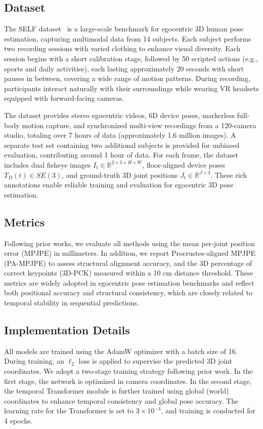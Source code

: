 \documentclass[conference]{IEEEtran}
\begin{document}
\subsection{Dataset}
The SELF dataset~\cite{b1} is a large-scale benchmark for egocentric 3D human pose estimation, capturing multimodal data from 14 subjects. Each subject performs two recording sessions with varied clothing to enhance visual diversity. Each session begins with a short calibration stage, followed by 50 scripted actions (e.g., sports and daily activities), each lasting approximately 20 seconds with short pauses in between, covering a wide range of motion patterns. During recording, participants interact naturally with their surroundings while wearing VR headsets equipped with forward-facing cameras.

The dataset provides stereo egocentric videos, 6D device poses, markerless full-body motion capture, and synchronized multi-view recordings from a 120-camera studio, totaling over 7 hours of data (approximately 1.6 million images). A separate test set containing two additional subjects is provided for unbiased evaluation, contributing around 1 hour of data. For each frame, the dataset includes dual fisheye images $I_t \in \mathbb{R}^{2 \times 3 \times H \times W}$, floor-aligned device poses $T_D(t) \in SE(3)$, and ground-truth 3D joint positions $J_t \in \mathbb{R}^{J \times 3}$. These rich annotations enable reliable training and evaluation for egocentric 3D pose estimation.


\subsection{Metrics}
Following prior works, we evaluate all methods using the mean per-joint position error (MPJPE) in millimeters. In addition, we report Procrustes-aligned MPJPE (PA-MPJPE) to assess structural alignment accuracy, and the 3D percentage of correct keypoints (3D-PCK) measured within a 10 cm distance threshold. These metrics are widely adopted in egocentric pose estimation benchmarks and reflect both positional accuracy and structural consistency, which are closely related to temporal stability in sequential predictions.


\subsection{Implementation Details}
All models are trained using the AdamW optimizer with a batch size of 16. During training, an $\ell_2$ loss is applied to supervise the predicted 3D joint coordinates. We adopt a two-stage training strategy following prior work. In the first stage, the network is optimized in camera coordinates. In the second stage, the temporal Transformer module is further trained using global (world) coordinates to enhance temporal consistency and global pose accuracy. The learning rate for the Transformer is set to $3 \times 10^{-4}$, and training is conducted for 4 epochs.
\end{document}
